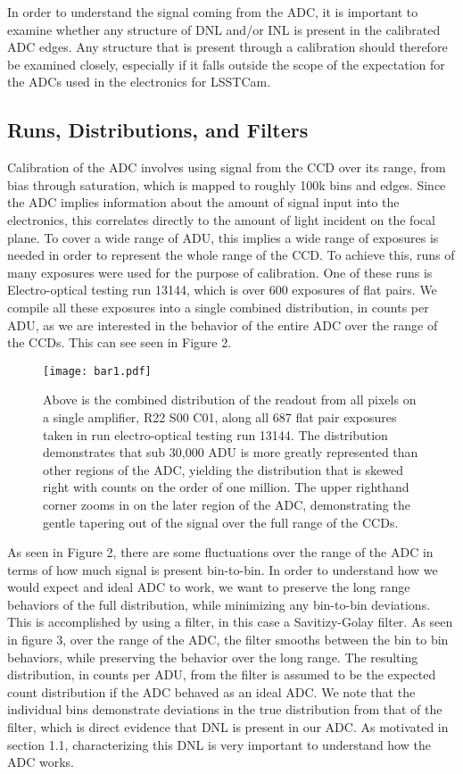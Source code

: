\documentclass[11pt, letterpaper]{article}
\begin{document}
In order to understand the signal coming from the ADC, it is important to examine whether any structure of DNL and/or INL is present in the calibrated ADC edges.
Any structure that is present through a calibration should therefore be examined closely, especially if it falls outside the scope of the expectation for the ADCs used in the electronics for LSSTCam. 


\subsection{Runs, Distributions, and Filters}
\indent

Calibration of the ADC involves using signal from the CCD over its range, from bias through saturation, which is mapped to roughly 100k bins and edges. 
Since the ADC implies information about the amount of signal input into the electronics, this correlates directly to the amount of light incident on the focal plane.
To cover a wide range of ADU, this implies a wide range of exposures is needed in order to represent the whole range of the CCD.
To achieve this, runs of many exposures were used for the purpose of calibration. 
One of these runs is Electro-optical testing run 13144, which is over 600 exposures of flat pairs. 
We compile all these exposures into a single combined distribution, in counts per ADU, as we are interested in the behavior of the entire ADC over the range of the CCDs. 
This can see seen in Figure 2. 

\begin{figure}
	\texttt{[image: bar1.pdf]}
	\caption{Above is the combined distribution of the readout from all pixels on a single amplifier, R22 S00 C01, along all 687 flat pair exposures taken in run electro-optical testing run 13144. The distribution demonstrates that sub 30,000 ADU is more greatly represented than other regions of the ADC, yielding the distribution that is skewed right with counts on the order of one million. The upper righthand corner zooms in on the later region of the ADC, demonstrating the gentle tapering out of the signal over the full range of the CCDs.}
\end{figure}
\indent 

As seen in Figure 2, there are some fluctuations over the range of the ADC in terms of how much signal is present bin-to-bin. 
In order to understand how we would expect and ideal ADC to work, we want to preserve the long range behaviors of the full distribution, while minimizing any bin-to-bin deviations. 
This is accomplished by using a filter, in this case a Savitizy-Golay filter. 
As seen in figure 3, over the range of the ADC, the filter smooths between the bin to bin behaviors, while preserving the behavior over the long range. 
The resulting distribution, in counts per ADU, from the filter is assumed to be the expected count distribution if the ADC behaved as an ideal ADC.  
We note that the individual bins demonstrate deviations in the true distribution from that of the filter, which is direct evidence that DNL is present in our ADC. 
As motivated in section 1.1, characterizing this DNL is very important to understand how the ADC works. 
\end{document}
